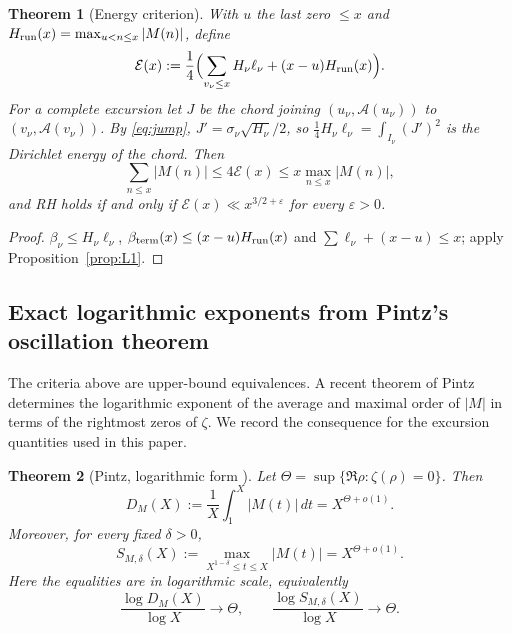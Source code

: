 \documentclass[11pt]{amsart}
\numberwithin{equation}{section}
\theoremstyle{plain}
\newtheorem{theorem}{Theorem}[section]
\theoremstyle{definition}
\theoremstyle{remark}
\newcommand{\Anet}{\mathcal{A}}
\newcommand{\eps}{\varepsilon}
\newcommand{\En}{\mathcal{E}}
\begin{document}
\begin{theorem}[Energy criterion]
\label{thm:energy}
With $u$ the last zero $\le x$ and $H_{\rm run}(x)=\max_{u<n\le x}|M(n)|$,
define
\begin{equation}
\label{eq:energy_def}
  \En(x):=\frac14\Bigl(\sum_{v_\nu\le x}H_\nu\ell_\nu+(x-u)H_{\rm run}(x)\Bigr).
\end{equation}
For a complete excursion let $J$ be the chord joining
$(u_\nu,\Anet(u_\nu))$ to $(v_\nu,\Anet(v_\nu))$. By \eqref{eq:jump},
$J'=\sigma_\nu\sqrt{H_\nu}/2$, so $\tfrac14H_\nu\ell_\nu=\int_{I_\nu}(J')^2$
is the Dirichlet energy of the chord. Then
\begin{equation}
\label{eq:energy_sandwich}
  \sum_{n\le x}|M(n)|\le4\En(x)\le x\max_{n\le x}|M(n)|,
\end{equation}
and RH holds if and only if $\En(x)\ll x^{3/2+\eps}$ for every $\eps>0$.
\end{theorem}

\begin{proof}
$\beta_\nu\le H_\nu\ell_\nu$, $\beta_{\rm term}(x)\le(x-u)H_{\rm run}(x)$ and
$\sum\ell_\nu+(x-u)\le x$; apply Proposition~\ref{prop:L1}.
\end{proof}

\subsection{Exact logarithmic exponents from Pintz's oscillation theorem}
\label{subsec:pintz-exponents}

The criteria above are upper-bound equivalences.  A recent theorem of
Pintz~\cite{Pintz2026} determines the logarithmic exponent of the average
and maximal order of $|M|$ in terms of the rightmost zeros of $\zeta$.
We record the consequence for the excursion quantities used in this paper.

\begin{theorem}[Pintz, logarithmic form {\cite{Pintz2026}}]
\label{thm:pintz-2026}
Let $\Theta=\sup\{\Re\rho:\zeta(\rho)=0\}$.  Then
\[
 D_M(X):=\frac1X\int_1^X|M(t)|\,dt=X^{\Theta+o(1)}.
\]
Moreover, for every fixed $\delta>0$,
\[
 S_{M,\delta}(X):=\max_{X^{1-\delta}\le t\le X}|M(t)|
 =X^{\Theta+o(1)}.
\]
Here the equalities are in logarithmic scale, equivalently
\[
 \frac{\log D_M(X)}{\log X}\to\Theta,
 \qquad
 \frac{\log S_{M,\delta}(X)}{\log X}\to\Theta.
\]
\end{theorem}
\end{document}
